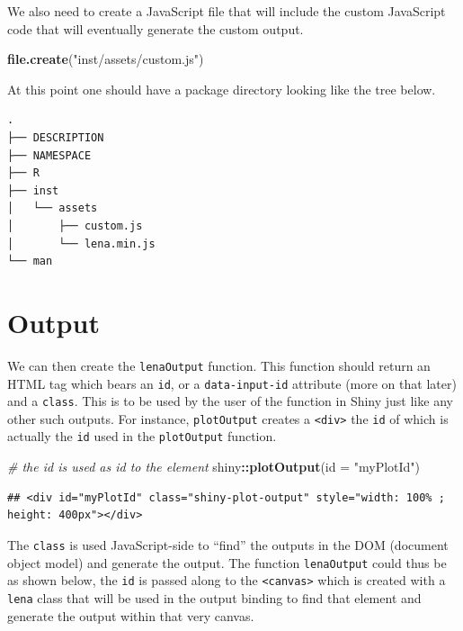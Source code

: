 \documentclass[
]{krantz}
\makeatletter
\newenvironment{Shaded}{\begin{snugshade}}{\end{snugshade}}
\newcommand{\CommentTok}[1]{\textcolor[rgb]{0.37,0.37,0.37}{\textit{#1}}}
\newcommand{\DataTypeTok}[1]{\textcolor[rgb]{0.27,0.27,0.27}{#1}}
\newcommand{\KeywordTok}[1]{\textcolor[rgb]{0.27,0.27,0.27}{\textbf{#1}}}
\newcommand{\NormalTok}[1]{#1}
\newcommand{\OperatorTok}[1]{\textcolor[rgb]{0.43,0.43,0.43}{\textbf{#1}}}
\newcommand{\StringTok}[1]{\textcolor[rgb]{0.5,0.5,0.5}{#1}}
\newenvironment{kframe}{%
\medskip{}
\setlength{\fboxsep}{.8em}
 \def\at@end@of@kframe{}%
 \ifinner\ifhmode%
  \def\at@end@of@kframe{\end{minipage}}%
  \begin{minipage}{\columnwidth}%
 \fi\fi%
 \def\FrameCommand##1{\hskip\@totalleftmargin \hskip-\fboxsep
 \colorbox{shadecolor}{##1}\hskip-\fboxsep
     \hskip-\linewidth \hskip-\@totalleftmargin \hskip\columnwidth}%
 \MakeFramed {\advance\hsize-\width
   \@totalleftmargin\z@ \linewidth\hsize
   \@setminipage}}%
 {\par\unskip\endMakeFramed%
 \at@end@of@kframe}
\renewenvironment{Shaded}{\begin{kframe}}{\end{kframe}}
\makeatother
\begin{document}
We also need to create a JavaScript file that will include the custom JavaScript code that will eventually generate the custom output.

\begin{Shaded}
\begin{Highlighting}[]
\KeywordTok{file.create}\NormalTok{(}\StringTok{"inst/assets/custom.js"}\NormalTok{)}
\end{Highlighting}
\end{Shaded}

At this point one should have a package directory looking like the tree below.

\begin{verbatim}
.
├── DESCRIPTION
├── NAMESPACE
├── R
├── inst
│   └── assets
│       ├── custom.js
│       └── lena.min.js
└── man
\end{verbatim}

\hypertarget{output}{%
\section*{Output}\label{output}}


We can then create the \texttt{lenaOutput} function. This function should return an HTML tag which bears an \texttt{id}, or a \texttt{data-input-id} attribute (more on that later) and a \texttt{class}. This is to be used by the user of the function in Shiny just like any other such outputs. For instance, \texttt{plotOutput} creates a \texttt{\textless{}div\textgreater{}} the \texttt{id} of which is actually the \texttt{id} used in the \texttt{plotOutput} function.

\begin{Shaded}
\begin{Highlighting}[]
\CommentTok{\# the id is used as id to the element}
\NormalTok{shiny}\OperatorTok{::}\KeywordTok{plotOutput}\NormalTok{(}\DataTypeTok{id =} \StringTok{"myPlotId"}\NormalTok{)}
\end{Highlighting}
\end{Shaded}

\begin{verbatim}
## <div id="myPlotId" class="shiny-plot-output" style="width: 100% ; height: 400px"></div>
\end{verbatim}

The \texttt{class} is used JavaScript-side to ``find'' the outputs in the DOM (document object model) and generate the output. The function \texttt{lenaOutput} could thus be as shown below, the \texttt{id} is passed along to the \texttt{\textless{}canvas\textgreater{}} which is created with a \texttt{lena} class that will be used in the output binding to find that element and generate the output within that very canvas.
\end{document}
